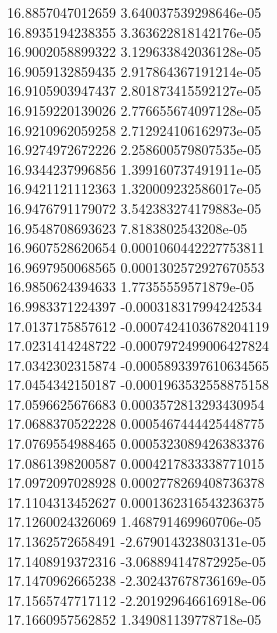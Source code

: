 {16.8857047012659 3.640037539298646e-05 \\
16.8935194238355 3.363622818142176e-05 \\
16.9002058899322 3.129633842036128e-05 \\
16.9059132859435 2.917864367191214e-05 \\
16.9105903947437 2.801873415592127e-05 \\
16.9159220139026 2.776655674097128e-05 \\
16.9210962059258 2.712924106162973e-05 \\
16.9274972672226 2.258600579807535e-05 \\
16.9344237996856 1.399160737491911e-05 \\
16.9421121112363 1.320009232586017e-05 \\
16.9476791179072 3.542383274179883e-05 \\
16.9548708693623 7.8183802543208e-05 \\
16.9607528620654 0.0001060442227753811 \\
16.9697950068565 0.0001302572927670553 \\
16.9850624394633 1.77355559571879e-05 \\
16.9983371224397 -0.000318317994242534 \\
17.0137175857612 -0.0007424103678204119 \\
17.0231414248722 -0.0007972499006427824 \\
17.0342302315874 -0.0005893397610634565 \\
17.0454342150187 -0.0001963532558875158 \\
17.0596625676683 0.0003572813293430954 \\
17.0688370522228 0.0005467444425448775 \\
17.0769554988465 0.0005323089426383376 \\
17.0861398200587 0.0004217833338771015 \\
17.0972097028928 0.0002778269408736378 \\
17.1104313452627 0.0001362316543236375 \\
17.1260024326069 1.468791469960706e-05 \\
17.1362572658491 -2.679014323803131e-05 \\
17.1408919372316 -3.068894147872925e-05 \\
17.1470962665238 -2.302437678736169e-05 \\
17.1565747717112 -2.201929646616918e-06 \\
17.1660957562852 1.349081139778718e-05 \\
}
